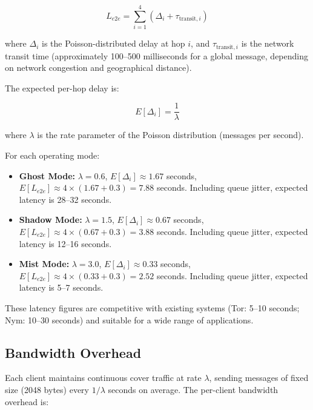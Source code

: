 \documentclass[11pt]{article}
\theoremstyle{definition}
\theoremstyle{remark}
\begin{document}
\begin{equation}
L_{e2e} = \sum_{i=1}^{4} (\Delta_i + \tau_{\text{transit},i})
\label{eq:latency}
\end{equation}

where $\Delta_i$ is the Poisson-distributed delay at hop $i$, and $\tau_{\text{transit},i}$ is the network transit time (approximately 100--500 milliseconds for a global message, depending on network congestion and geographical distance).

The expected per-hop delay is:

\begin{equation}
E[\Delta_i] = \frac{1}{\lambda}
\label{eq:poisson-delay}
\end{equation}

where $\lambda$ is the rate parameter of the Poisson distribution (messages per second).

For each operating mode:

\begin{itemize}
    \item \textbf{Ghost Mode:} $\lambda = 0.6$, $E[\Delta_i] \approx 1.67$ seconds, $E[L_{e2e}] \approx 4 \times (1.67 + 0.3) = 7.88$ seconds. Including queue jitter, expected latency is 28--32 seconds.

    \item \textbf{Shadow Mode:} $\lambda = 1.5$, $E[\Delta_i] \approx 0.67$ seconds, $E[L_{e2e}] \approx 4 \times (0.67 + 0.3) = 3.88$ seconds. Including queue jitter, expected latency is 12--16 seconds.

    \item \textbf{Mist Mode:} $\lambda = 3.0$, $E[\Delta_i] \approx 0.33$ seconds, $E[L_{e2e}] \approx 4 \times (0.33 + 0.3) = 2.52$ seconds. Including queue jitter, expected latency is 5--7 seconds.
\end{itemize}

These latency figures are competitive with existing systems (Tor: 5--10 seconds; Nym: 10--30 seconds) and suitable for a wide range of applications.

\subsection{Bandwidth Overhead}
\label{subsec:bandwidth}

Each client maintains continuous cover traffic at rate $\lambda$, sending messages of fixed size (2048 bytes) every $1/\lambda$ seconds on average. The per-client bandwidth overhead is:
\end{document}
